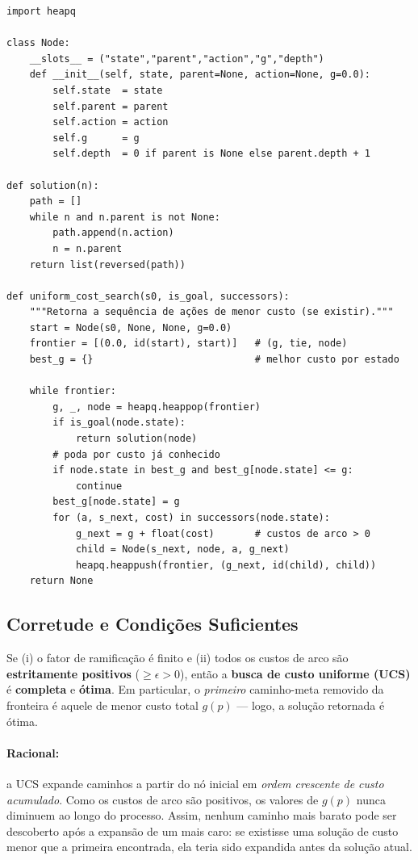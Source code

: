 \documentclass[9pt,a4paper]{extarticle}
\begin{document}
\begin{lstlisting}
import heapq

class Node:
    __slots__ = ("state","parent","action","g","depth")
    def __init__(self, state, parent=None, action=None, g=0.0):
        self.state  = state
        self.parent = parent
        self.action = action
        self.g      = g
        self.depth  = 0 if parent is None else parent.depth + 1

def solution(n):
    path = []
    while n and n.parent is not None:
        path.append(n.action)
        n = n.parent
    return list(reversed(path))

def uniform_cost_search(s0, is_goal, successors):
    """Retorna a sequência de ações de menor custo (se existir)."""
    start = Node(s0, None, None, g=0.0)
    frontier = [(0.0, id(start), start)]   # (g, tie, node)
    best_g = {}                            # melhor custo por estado

    while frontier:
        g, _, node = heapq.heappop(frontier)
        if is_goal(node.state):
            return solution(node)
        # poda por custo já conhecido
        if node.state in best_g and best_g[node.state] <= g:
            continue
        best_g[node.state] = g
        for (a, s_next, cost) in successors(node.state):
            g_next = g + float(cost)       # custos de arco > 0
            child = Node(s_next, node, a, g_next)
            heapq.heappush(frontier, (g_next, id(child), child))
    return None
\end{lstlisting}

\subsection*{Corretude e Condições Suficientes}

Se (i) o fator de ramificação é finito e (ii) todos os custos de arco são
\textbf{estritamente positivos} ($\ge \epsilon > 0$), então a
\textbf{busca de custo uniforme (UCS)} é \textbf{completa} e
\textbf{ótima}.  
Em particular, o \emph{primeiro} caminho-meta removido da fronteira
é aquele de menor custo total $g(p)$ — logo, a solução retornada é ótima.

\paragraph{Racional:}
a UCS expande caminhos a partir do nó inicial em \emph{ordem crescente de custo acumulado}.
Como os custos de arco são positivos, os valores de $g(p)$ nunca diminuem ao longo do processo.
Assim, nenhum caminho mais barato pode ser descoberto após a expansão de um mais caro:
se existisse uma solução de custo menor que a primeira encontrada, ela teria sido expandida
antes da solução atual.
\end{document}
